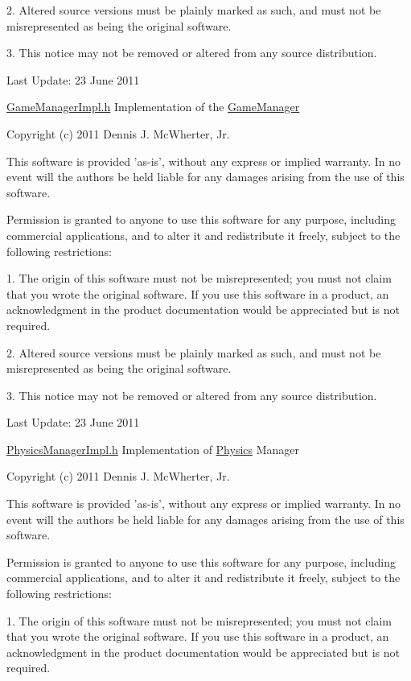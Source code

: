 2. Altered source versions must be plainly marked as such, and must not be misrepresented as being the original software.

3. This notice may not be removed or altered from any source distribution.

Last Update: 23 June 2011

\hyperlink{_game_manager_impl_8h_source}{GameManagerImpl.h} Implementation of the \hyperlink{class_micro_f_p_s_1_1_game_manager}{GameManager}

Copyright (c) 2011 Dennis J. McWherter, Jr.

This software is provided 'as-\/is', without any express or implied warranty. In no event will the authors be held liable for any damages arising from the use of this software.

Permission is granted to anyone to use this software for any purpose, including commercial applications, and to alter it and redistribute it freely, subject to the following restrictions:

1. The origin of this software must not be misrepresented; you must not claim that you wrote the original software. If you use this software in a product, an acknowledgment in the product documentation would be appreciated but is not required.

2. Altered source versions must be plainly marked as such, and must not be misrepresented as being the original software.

3. This notice may not be removed or altered from any source distribution.

Last Update: 23 June 2011

\hyperlink{_physics_manager_impl_8h_source}{PhysicsManagerImpl.h} Implementation of \hyperlink{class_micro_f_p_s_1_1_physics}{Physics} Manager

Copyright (c) 2011 Dennis J. McWherter, Jr.

This software is provided 'as-\/is', without any express or implied warranty. In no event will the authors be held liable for any damages arising from the use of this software.

Permission is granted to anyone to use this software for any purpose, including commercial applications, and to alter it and redistribute it freely, subject to the following restrictions:

1. The origin of this software must not be misrepresented; you must not claim that you wrote the original software. If you use this software in a product, an acknowledgment in the product documentation would be appreciated but is not required.

